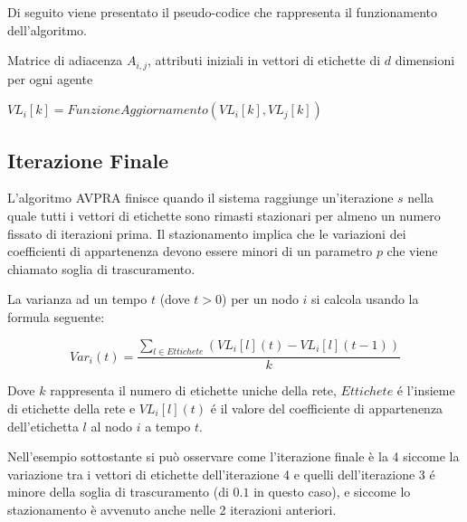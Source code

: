 \documentclass[a4paper,12pt]{report}
\begin{document}
		Di seguito viene presentato il pseudo-codice che rappresenta il funzionamento dell'algoritmo. \cite{avpra}
 
		\begin{algorithmic}
			\REQUIRE Matrice di adiacenza $A_{i, j}$, attributi iniziali in vettori di etichette di $d$ dimensioni per ogni agente


				\STATE {}

					
					\STATE {}


						\STATE {}

							\STATE $VL_i[k] = FunzioneAggiornamento(VL_i[k], VL_j[k])$

						\ENDIF
					\ENDFOR
				\ENDFOR	
			\ENDFOR
		\end{algorithmic}

		\subsection{Iterazione Finale}
		L'algoritmo AVPRA finisce quando il sistema raggiunge un'iterazione $s$ nella quale tutti i vettori di etichette sono rimasti stazionari per almeno un numero fissato di iterazioni prima. Il stazionamento implica che le variazioni dei coefficienti di appartenenza devono essere minori di un parametro $p$ che viene chiamato soglia di trascuramento.  \cite{avpra}

		La varianza ad un tempo $t$ (dove $t > 0$) per un nodo $i$ si calcola usando la formula seguente:
		
		\begin{equation}
			Var_i(t) = \frac{\sum_{l \in Ettichete} (VL_i[l](t) - VL_i[l](t-1))}{k}
		\end{equation}

		Dove $k$ rappresenta il numero di etichette uniche della rete, $Ettichete$ é l'insieme di etichette della rete e $VL_i[l](t)$ é il valore del coefficiente di appartenenza dell'etichetta $l$ al nodo $i$ a tempo $t$.

		Nell'esempio sottostante si può osservare come l'iterazione finale è la 4 siccome la variazione tra i vettori di etichette dell'iterazione 4 e quelli dell'iterazione 3 é minore della soglia di trascuramento (di $0.1$ in questo caso), e siccome lo stazionamento è avvenuto anche nelle 2 iterazioni anteriori.
		
\end{document}
